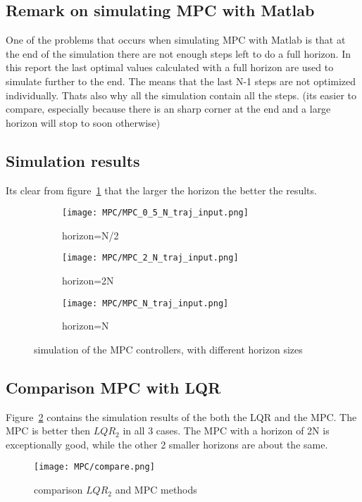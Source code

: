 \subsection{Remark on simulating MPC with Matlab}
One of the problems that occurs when simulating MPC with Matlab is that at the end of the simulation there are not enough steps left to do a full horizon. In this report the last optimal values calculated with a full horizon are used to simulate further to the end. The means that the last N-1 steps are not optimized individually. Thats also why all the simulation contain all the steps. (its easier to compare, especially because there is an sharp corner at the end and a large horizon will stop to soon otherwise)

\subsection{Simulation results}
Its clear from figure~\ref{fig:MPC simulation} that the larger the horizon the better the results.
\begin{figure}[H]
	\centering
	\begin{subfigure}[b]{0.45\textwidth}
		\texttt{[image: MPC/MPC\_0\_5\_N\_traj\_input.png]}
		\caption{horizon=N/2}
	\end{subfigure}
	\begin{subfigure}[b]{0.45\textwidth}
		\texttt{[image: MPC/MPC\_2\_N\_traj\_input.png]}
		\caption{horizon=2N}
	\end{subfigure}
	\begin{subfigure}[b]{0.45\textwidth}
		\texttt{[image: MPC/MPC\_N\_traj\_input.png]}
		\caption{horizon=N}
	\end{subfigure}
	\caption{simulation of the MPC controllers, with different horizon sizes}
	\label{fig:MPC simulation}
\end{figure}

\subsection{Comparison MPC with LQR}
Figure~\ref{fig:compare LQR and MPC} contains the simulation results of the both the LQR and the MPC. The MPC is better then $LQR_2$ in all 3 cases. The MPC with a horizon of 2N is exceptionally good, while the other 2 smaller horizons are about the same.
\begin{figure}[H]
	\centering
	\texttt{[image: MPC/compare.png]}
	\caption{comparison $LQR_2$ and MPC methods}
	\label{fig:compare LQR and MPC}
\end{figure}

